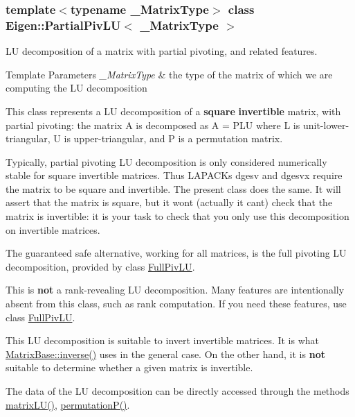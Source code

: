 \subsubsection*{template$<$typename \+\_\+\+Matrix\+Type$>$\newline
class Eigen\+::\+Partial\+Piv\+L\+U$<$ \+\_\+\+Matrix\+Type $>$}

LU decomposition of a matrix with partial pivoting, and related features. 


\begin{DoxyTemplParams}{Template Parameters}
{\em \+\_\+\+Matrix\+Type} & the type of the matrix of which we are computing the LU decomposition\\
\hline
\end{DoxyTemplParams}
This class represents a LU decomposition of a {\bfseries square} {\bfseries invertible} matrix, with partial pivoting\+: the matrix A is decomposed as A = P\+LU where L is unit-\/lower-\/triangular, U is upper-\/triangular, and P is a permutation matrix.

Typically, partial pivoting LU decomposition is only considered numerically stable for square invertible matrices. Thus L\+A\+P\+A\+CK\textquotesingle{}s dgesv and dgesvx require the matrix to be square and invertible. The present class does the same. It will assert that the matrix is square, but it won\textquotesingle{}t (actually it can\textquotesingle{}t) check that the matrix is invertible\+: it is your task to check that you only use this decomposition on invertible matrices.

The guaranteed safe alternative, working for all matrices, is the full pivoting LU decomposition, provided by class \hyperlink{group___l_u___module_class_eigen_1_1_full_piv_l_u}{Full\+Piv\+LU}.

This is {\bfseries not} a rank-\/revealing LU decomposition. Many features are intentionally absent from this class, such as rank computation. If you need these features, use class \hyperlink{group___l_u___module_class_eigen_1_1_full_piv_l_u}{Full\+Piv\+LU}.

This LU decomposition is suitable to invert invertible matrices. It is what \hyperlink{group___core___module_a7712eb69e8ea3c8f7b8da1c44dbdeebf}{Matrix\+Base\+::inverse()} uses in the general case. On the other hand, it is {\bfseries not} suitable to determine whether a given matrix is invertible.

The data of the LU decomposition can be directly accessed through the methods \hyperlink{group___l_u___module_abea0d7e51c5591a6db152eade0892d9c}{matrix\+L\+U()}, \hyperlink{group___l_u___module_a1c637530b3215787668a75ebb2e7b882}{permutation\+P()}.

